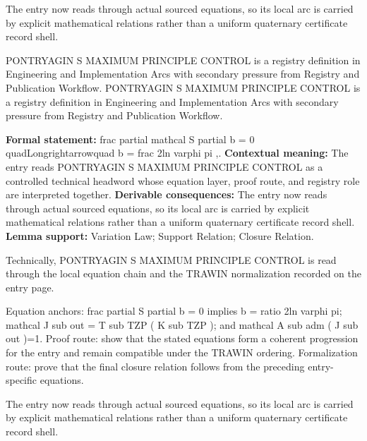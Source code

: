 The entry now reads through actual sourced equations, so its local arc is carried by explicit mathematical relations rather than a uniform quaternary certificate record shell.
\clearpage


\begingroup\small
{}
PONTRYAGIN S MAXIMUM PRINCIPLE CONTROL is a registry definition in Engineering and Implementation Arcs with secondary pressure from Registry and Publication Workflow. PONTRYAGIN S MAXIMUM PRINCIPLE CONTROL is a registry definition in Engineering and Implementation Arcs with secondary pressure from Registry and Publication Workflow.

\begingroup\footnotesize\setlength{\emergencystretch}{3em}\sloppy
\textbf{Formal statement:} frac partial mathcal S partial b = 0 quadLongrightarrowquad b = frac 2ln varphi pi ,. \textbf{Contextual meaning:} The entry reads PONTRYAGIN S MAXIMUM PRINCIPLE CONTROL as a controlled technical headword whose equation layer, proof route, and registry role are interpreted together. \textbf{Derivable consequences:} The entry now reads through actual sourced equations, so its local arc is carried by explicit mathematical relations rather than a uniform quaternary certificate record shell. \textbf{Lemma support:} Variation Law; Support Relation; Closure Relation.\par
\endgroup

Technically, PONTRYAGIN S MAXIMUM PRINCIPLE CONTROL is read through the local equation chain and the TRAWIN normalization recorded on the entry page.

Equation anchors: frac partial S partial b = 0 implies b = ratio 2ln varphi pi; mathcal J sub out = T sub TZP ( K sub TZP ); and mathcal A sub adm ( J sub out )=1. Proof route: show that the stated equations form a coherent progression for the entry and remain compatible under the TRAWIN ordering. Formalization route: prove that the final closure relation follows from the preceding entry-specific equations.

The entry now reads through actual sourced equations, so its local arc is carried by explicit mathematical relations rather than a uniform quaternary certificate record shell.
\endgroup

